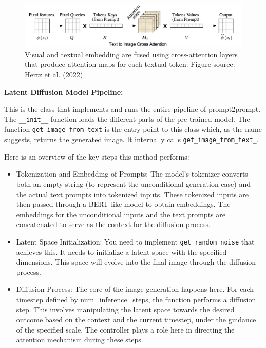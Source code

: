 \documentclass[11pt,addpoints,answers]{exam}
\begin{document}
\begin{questions}
    \begin{figure}[h!]
        \centering
        \includegraphics[width=.9\linewidth]{fig/cross_attention.png}
        \caption{Visual and textual embedding are fused using cross-attention layers that produce attention maps for each textual token. Figure source: \href{https://arxiv.org/pdf/2208.01626.pdf}{Hertz et al. (2022)}}
        \label{fig:crossattention}
    \end{figure}

\textbf{Latent Diffusion Model Pipeline:} 

This is the class that implements and runs the entire pipeline of prompt2prompt. The \lstinline{__init__} function loads the different parts of the pre-trained model. The function \lstinline{get_image_from_text} is the entry point to this class which, as the name suggests, returns the generated image. It internally calls \lstinline{get_image_from_text_}.

Here is an overview of the key steps this method performs:
\begin{itemize}
 
 \item Tokenization and Embedding of Prompts: The model's tokenizer converts both an empty string (to represent the unconditional generation case) and the actual text prompts into tokenized inputs. These tokenized inputs are then passed through a BERT-like model to obtain embeddings. The embeddings for the unconditional inputs and the text prompts are concatenated to serve as the context for the diffusion process.
 
 \item Latent Space Initialization: You need to implement \lstinline{get_random_noise} that achieves this. It needs to initialize a latent space with the specified dimensions. This space will evolve into the final image through the diffusion process.
 
  \item Diffusion Process: The core of the image generation happens here. For each timestep defined by num\_inference\_steps, the function performs a diffusion step. This involves manipulating the latent space towards the desired outcome based on the context and the current timestep, under the guidance of the specified scale. The controller plays a role here in directing the attention mechanism during these steps.


\end{itemize}
\end{questions}
\end{document}
